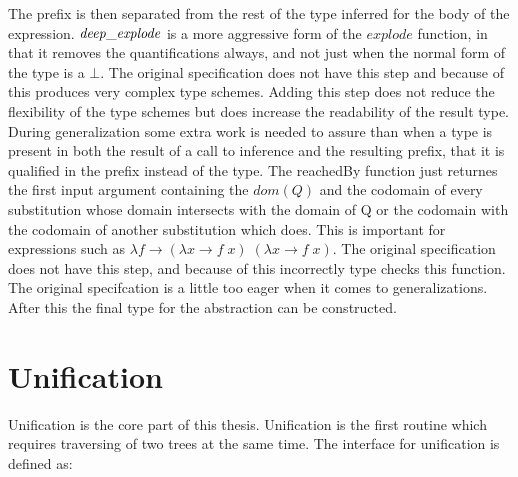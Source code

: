 \documentclass[twoside, titlepage, openright, a4paper]{book}
\newcommand{\Conid}[1]{\mathit{#1}}
\newcommand{\Varid}[1]{\mathit{#1}}
\begin{document}
The prefix is then separated from the rest of the type inferred for the body of the expression. \ensuremath{\Varid{deep\char95 explode}} is a more aggressive form of the \ensuremath{\Varid{explode}} function, in that it removes the quantifications always, and not just when the normal form of the type is a \ensuremath{\bot}. The original specification does not have this step and because of this produces very complex type schemes. Adding this step does not reduce the flexibility of the type schemes but does increase the readability of the result type. 
During generalization some extra work is needed to assure than when a type is present in both the result of a call to inference and the resulting prefix, that it is qualified in the prefix instead of the type.
The reachedBy function just returnes the first input argument containing the \ensuremath{\Varid{dom}(\Conid{Q})} and the codomain of every substitution whose domain intersects with the domain of Q or the codomain with the codomain of another substitution which does. This is important for expressions such as \ensuremath{\lambda \Varid{f}\to (\lambda \Varid{x}\to \Varid{f}\;\Varid{x})\;(\lambda \Varid{x}\to \Varid{f}\;\Varid{x})}. The original specification does not have this step, and because of this incorrectly type checks this function. The original specifcation is a little too eager when it comes to generalizations. After this the final type for the abstraction can be constructed.

\section{Unification}
Unification is the core part of this thesis. Unification is the first routine which requires traversing of two trees at the same time. The interface for unification is defined as:
\end{document}

